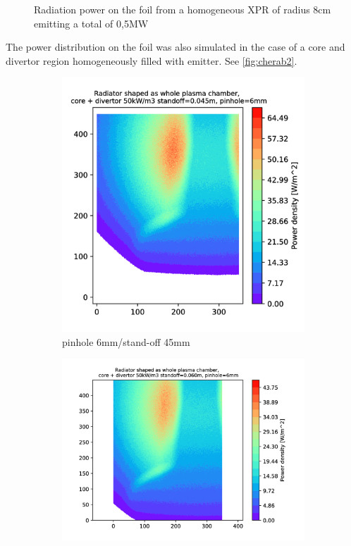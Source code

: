 \begin{figure}
    \caption{Radiation power on the foil from a homogeneous XPR of radius 8cm emitting a total of 0,5MW}
    \label{fig:cherab1}
\end{figure}

The power distribution on the foil was also simulated in the case of a core and divertor region homogeneously filled with emitter. See \autoref{fig:cherab2}.

\begin{figure}
     \centering
     \begin{subfigure}{0.4\textwidth}
         \centering
         \includegraphics[trim={70 0 0 0},clip,width=\textwidth]{Chapters/chapter2/figs/6_45_all.png}
         \caption{pinhole 6mm/stand-off 45mm}
         \label{fig:6_45_all}
     \end{subfigure}
     \hfill
     \begin{subfigure}{0.50\textwidth}
         \centering
         \includegraphics[trim={130 0 150 0},clip,width=\textwidth]{Chapters/chapter2/figs/6_60_all.png}

\end{subfigure}
\end{figure}
